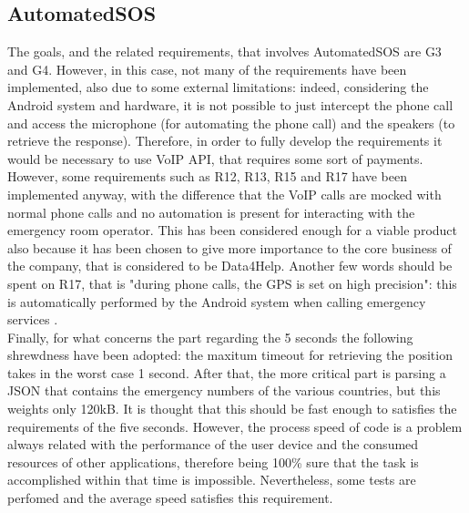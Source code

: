 \subsection{AutomatedSOS}
The goals, and the related requirements, that involves AutomatedSOS are G3 and G4. 
However, in this case, not many of the requirements have been implemented, also due to some external limitations: indeed, considering
the Android system and hardware, it is not possible to just intercept the phone call and access the microphone (for automating the phone call)
and the speakers (to retrieve the response). 
Therefore, in order to fully develop the requirements it would be necessary to use VoIP API, that requires some sort of payments.
However, some requirements such as R12, R13, R15 and R17 have been implemented anyway, with the difference that the VoIP calls are mocked
with normal phone calls and no automation is present for interacting with the emergency room operator. 
This has been considered enough for a viable product also because it has been chosen to give more importance to the core business of the 
company, that is considered to be Data4Help. 
Another few words should be spent on R17, that is "during phone calls, the GPS is set on high precision": this is automatically performed
by the Android system when calling emergency services \cite{androidELS}. \\
Finally, for what concerns the part regarding the 5 seconds the following shrewdness have been adopted: the maxitum timeout for retrieving 
the position takes in the worst case 1 second. 
After that, the more critical part is parsing a JSON that contains the emergency numbers of the various countries, but this weights only
120kB. 
It is thought that this should be fast enough to satisfies the requirements of the five seconds. 
However, the process speed of code is a problem always related with the performance of the user device and the consumed resources of other 
applications, therefore being 100\% sure that the task is accomplished within that time is impossible. Nevertheless, some tests are perfomed
and the average speed satisfies this requirement.

